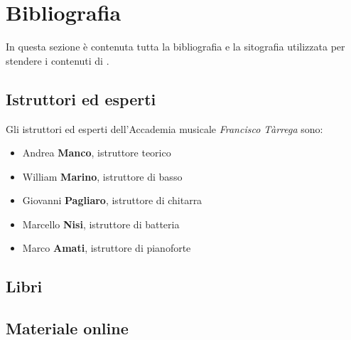 \section{Bibliografia}
In questa sezione è contenuta tutta la bibliografia e la sitografia utilizzata per stendere i contenuti di \ProjectTitle{}.
\subsection{Istruttori ed esperti}
Gli istruttori ed esperti dell'Accademia musicale \emph{Francisco Tàrrega} sono:
\begin{itemize}
	\item Andrea \textbf{Manco}, istruttore teorico
	\item William \textbf{Marino}, istruttore di basso
	\item Giovanni \textbf{Pagliaro}, istruttore di chitarra
	\item Marcello \textbf{Nisi}, istruttore di batteria
	\item Marco \textbf{Amati}, istruttore di pianoforte
\end{itemize}
\nocite{*}
\subsection{Libri}
\printbibliography[heading=none,type=book]
\subsection{Materiale online}
\printbibliography[heading=none,type=online]